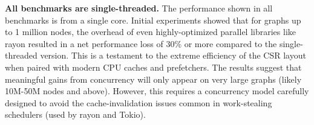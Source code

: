 \textbf{All benchmarks are single-threaded.} The performance shown in all benchmarks is from a single core. Initial experiments showed that for graphs up to 1 million nodes, the overhead of even highly-optimized parallel libraries like rayon resulted in a  net performance loss of 30\% or more compared to the single-threaded version. This is a testament to the extreme  efficiency of the CSR layout when paired with modern CPU caches and prefetchers.  The results suggest that meaningful gains from concurrency will only appear on very large graphs (likely 10M-50M nodes  and above). However, this requires a concurrency model carefully designed to avoid the cache-invalidation issues common in work-stealing schedulers (used by rayon and Tokio). 



\newpage